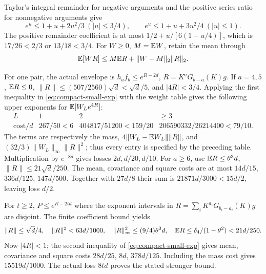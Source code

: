 Taylor's integral remainder for negative arguments and the positive
series ratio for nonnegative arguments give
\begin{equation}\label{eq:compact-small-exp}
 e^u\le1+u+2u^2/3\ (|u|\le3/4),\qquad
 e^u\le1+u+3u^2/4\ (|u|\le1).
\end{equation}
The positive remainder coefficient is at most
$1/2+u/[6(1-u/4)]$, which is $17/26<2/3$ or $13/18<3/4$.
For $W\ge0$, $M=\mathbb E W$, retain the mean through
\begin{equation}\label{eq:compact-weight-tail}
 \mathbb E[WR]\le M\mathbb E R+\|W-M\|_2\|R\|_2.
\end{equation}

For one pair, the actual envelope is
$h_af_b\le e^{R-2d}$, $R=K^aG_{b-a}(K)g$.
If $a=4,5$, $\mathbb E R\le0$, $\|R\|\le(507/2560)\sqrt d<\sqrt d/5$,
and $|4R|<3/4$. Applying the first inequality in
\eqref{eq:compact-small-exp} with the weight table gives the following
upper exponents for $\mathbb E[W_Le^{4R}]$:
\[
 \begin{array}{c|ccc}
 L&1&2&\ge3\\\hline
 \text{cost}/d&
 267/50<6&404817/51200<159/20&206590332/26214400<79/10.
 \end{array}
\]
The terms are respectively the mass, $4\|W_L-\mathbb E W_L\|\|R\|$,
and $(32/3)\|W_L\|_\infty\|R\|^2$; thus every entry is specified
by the preceding table. Multiplication by $e^{-8d}$ gives losses
$2d,d/20,d/10$.
For $a\ge6$, use
$\mathbb E R\le\theta^3d$, $\|R\|\le21\sqrt d/250$.
The mean, covariance and square costs are at most
$14d/15$, $336d/125$, $147d/500$.
Together with $27d/8$ their sum is $21871d/3000<15d/2$,
leaving loss $d/2$.

For $t\ge2$, $P\le e^{R-2td}$ where the exponent intervals in
$R=\sum_iK^{a_i}G_{b_i-a_i}(K)g$ are disjoint.
The finite coefficient bound yields
\[
 \|R\|\le\sqrt d/4,\quad \|R\|^2<63d/1000,
 \quad\|R\|_\infty^2\le(9/4)\theta^3d,\quad
 \mathbb E R\le \delta_{4}/(1-\theta^2)<21d/250.
\]
Now $|4R|<1$; the second inequality of \eqref{eq:compact-small-exp}
gives mean, covariance and square costs $28d/25$, $8d$, $378d/125$.
Including the mass cost gives $15519d/1000$.
The actual loss $8td$ proves the stated stronger bound.

